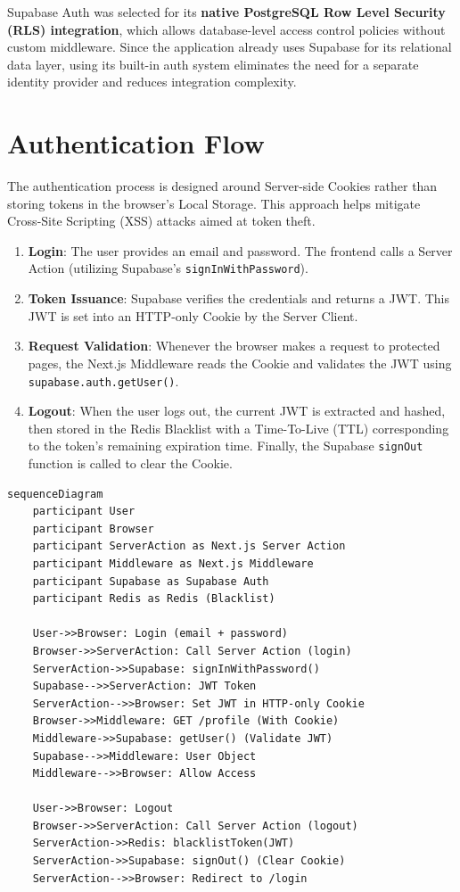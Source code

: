 Supabase Auth was selected for its \textbf{native PostgreSQL Row Level Security (RLS) integration}, which allows database-level access control policies without custom middleware. Since the application already uses Supabase for its relational data layer, using its built-in auth system eliminates the need for a separate identity provider and reduces integration complexity.

\section{Authentication Flow}

The authentication process is designed around Server-side Cookies rather than storing tokens in the browser's Local Storage. This approach helps mitigate Cross-Site Scripting (XSS) attacks aimed at token theft.

\begin{enumerate}
\item \textbf{Login}: The user provides an email and password. The frontend calls a Server Action (utilizing Supabase's \texttt{signInWithPassword}).
\item \textbf{Token Issuance}: Supabase verifies the credentials and returns a JWT. This JWT is set into an HTTP-only Cookie by the Server Client.
\item \textbf{Request Validation}: Whenever the browser makes a request to protected pages, the Next.js Middleware reads the Cookie and validates the JWT using \texttt{supabase.auth.getUser()}.
\item \textbf{Logout}: When the user logs out, the current JWT is extracted and hashed, then stored in the Redis Blacklist with a Time-To-Live (TTL) corresponding to the token's remaining expiration time. Finally, the Supabase \texttt{signOut} function is called to clear the Cookie.
\end{enumerate}

\begin{verbatim}
sequenceDiagram
    participant User
    participant Browser
    participant ServerAction as Next.js Server Action
    participant Middleware as Next.js Middleware
    participant Supabase as Supabase Auth
    participant Redis as Redis (Blacklist)

    User->>Browser: Login (email + password)
    Browser->>ServerAction: Call Server Action (login)
    ServerAction->>Supabase: signInWithPassword()
    Supabase-->>ServerAction: JWT Token
    ServerAction-->>Browser: Set JWT in HTTP-only Cookie
    Browser->>Middleware: GET /profile (With Cookie)
    Middleware->>Supabase: getUser() (Validate JWT)
    Supabase-->>Middleware: User Object
    Middleware-->>Browser: Allow Access

    User->>Browser: Logout
    Browser->>ServerAction: Call Server Action (logout)
    ServerAction->>Redis: blacklistToken(JWT)
    ServerAction->>Supabase: signOut() (Clear Cookie)
    ServerAction-->>Browser: Redirect to /login
\end{verbatim}

